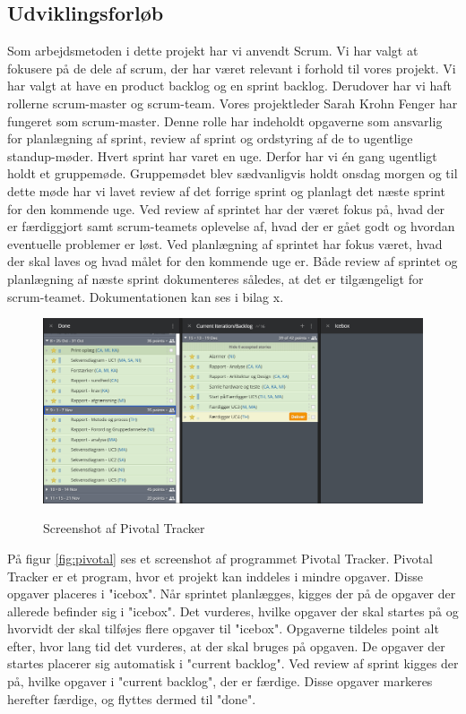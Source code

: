 \subsection{Udviklingsforløb}\label{sec:udvikling}
Som arbejdsmetoden i dette projekt har vi anvendt Scrum. Vi har valgt at fokusere på de dele af scrum, der har været relevant i forhold til vores projekt. Vi har valgt at have en product backlog og en sprint backlog. Derudover har vi haft rollerne scrum-master og scrum-team. Vores projektleder Sarah Krohn Fenger har fungeret som scrum-master. Denne rolle har indeholdt opgaverne som ansvarlig for planlægning af sprint, review af sprint og ordstyring af de to ugentlige standup-møder. Hvert sprint har varet en uge. Derfor har vi én gang ugentligt holdt et gruppemøde. Gruppemødet blev sædvanligvis holdt onsdag morgen og til dette møde har vi lavet review af det forrige sprint og planlagt det næste sprint for den kommende uge. Ved review af sprintet har der været fokus på, hvad der er færdiggjort samt scrum-teamets oplevelse af, hvad der er gået godt og hvordan eventuelle problemer er løst. Ved planlægning af sprintet har fokus været, hvad der skal laves og hvad målet for den kommende uge er. Både review af sprintet og planlægning af næste sprint dokumenteres således, at det er tilgængeligt for scrum-teamet. Dokumentationen kan ses i bilag x.

	\begin{figure}[h!]
	\centering
	\includegraphics[width=0.9\linewidth]{Udviklingsproces/Metode/PivotalTracker}
	\label{fig:pivotal}
	\caption{Screenshot af Pivotal Tracker}
\end{figure}

På figur \vref{fig:pivotal} ses et screenshot af programmet Pivotal Tracker. Pivotal Tracker er et program, hvor et projekt kan inddeles i mindre opgaver. Disse opgaver placeres i "icebox". Når sprintet planlægges, kigges der på de opgaver der allerede befinder sig i "icebox". Det vurderes, hvilke opgaver der skal startes på og hvorvidt der skal tilføjes flere opgaver til "icebox". Opgaverne tildeles point alt efter, hvor lang tid det vurderes, at der skal bruges på opgaven. De opgaver der startes placerer sig automatisk i "current backlog". Ved review af sprint kigges der på, hvilke opgaver i "current backlog", der er færdige. Disse opgaver markeres herefter færdige, og flyttes dermed til "done". 

